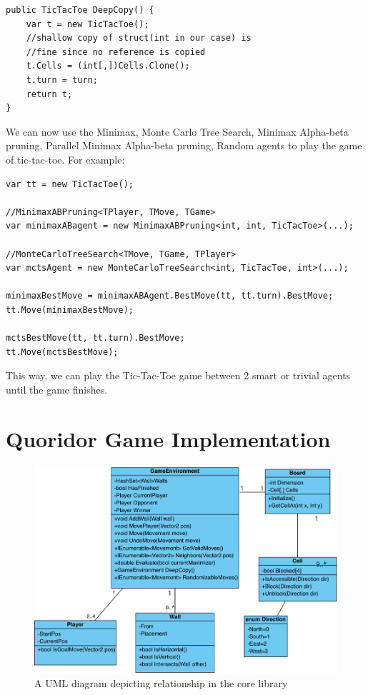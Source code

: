 \begin{lstlisting}
public TicTacToe DeepCopy() {
    var t = new TicTacToe();
    //shallow copy of struct(int in our case) is
    //fine since no reference is copied
    t.Cells = (int[,])Cells.Clone();
    t.turn = turn;
    return t;
}
\end{lstlisting}

We can now use the Minimax, Monte Carlo Tree Search, Minimax Alpha-beta pruning, Parallel Minimax Alpha-beta pruning, Random agents to play the game of tic-tac-toe. For example:

\begin{lstlisting}
var tt = new TicTacToe();

//MinimaxABPruning<TPlayer, TMove, TGame>
var minimaxABagent = new MinimaxABPruning<int, int, TicTacToe>(...);

//MonteCarloTreeSearch<TMove, TGame, TPlayer>
var mctsAgent = new MonteCarloTreeSearch<int, TicTacToe, int>(...);

minimaxBestMove = minimaxABAgent.BestMove(tt, tt.turn).BestMove;
tt.Move(minimaxBestMove);

mctsBestMove(tt, tt.turn).BestMove;
tt.Move(mctsBestMove);
\end{lstlisting}

This way, we can play the Tic-Tac-Toe game between 2 smart or trivial agents until the game finishes.

\section{Quoridor Game Implementation}\label{sec:gameimplementation}

\begin{figure}[!ht]
    \centering
    \includegraphics[width=.95\linewidth]{../img/uml_core.png}
    \caption{A UML diagram depicting relationship in the core library}
    \label{fig:core_uml}
\end{figure}


